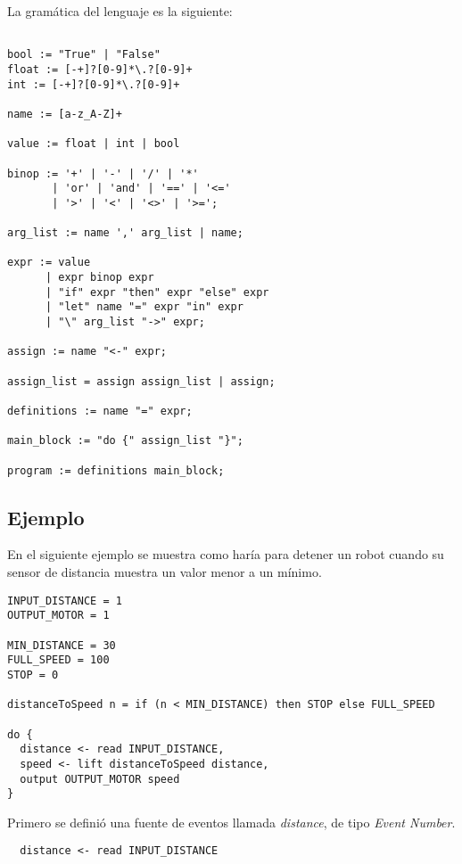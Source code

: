 La gramática del lenguaje es la siguiente:

\begin{verbatim}

bool := "True" | "False"
float := [-+]?[0-9]*\.?[0-9]+
int := [-+]?[0-9]*\.?[0-9]+

name := [a-z_A-Z]+

value := float | int | bool

binop := '+' | '-' | '/' | '*'
       | 'or' | 'and' | '==' | '<='
       | '>' | '<' | '<>' | '>=';

arg_list := name ',' arg_list | name;

expr := value
      | expr binop expr
      | "if" expr "then" expr "else" expr
      | "let" name "=" expr "in" expr
      | "\" arg_list "->" expr;

assign := name "<-" expr;

assign_list = assign assign_list | assign;

definitions := name "=" expr;

main_block := "do {" assign_list "}";

program := definitions main_block;

\end{verbatim}


\subsection{Ejemplo}

En el siguiente ejemplo se muestra como haría para detener un
robot cuando su sensor de distancia muestra un valor menor a un mínimo.

\begin{verbatim}
INPUT_DISTANCE = 1
OUTPUT_MOTOR = 1

MIN_DISTANCE = 30
FULL_SPEED = 100
STOP = 0

distanceToSpeed n = if (n < MIN_DISTANCE) then STOP else FULL_SPEED

do { 
  distance <- read INPUT_DISTANCE,
  speed <- lift distanceToSpeed distance,
  output OUTPUT_MOTOR speed
}

\end{verbatim}

Primero se definió una fuente de eventos llamada \emph{distance},
de tipo \emph{Event Number}.

\begin{verbatim}
  distance <- read INPUT_DISTANCE
\end{verbatim}

